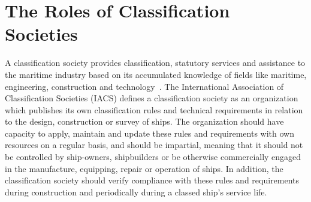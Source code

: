 % 

\section{The Roles of Classification Societies}
A classification society provides classification, statutory services and assistance to the maritime industry based on its accumulated knowledge of fields like
maritime, engineering, construction and technology~\citep{Hormann2006}.
The International Association of Classification Societies (IACS) defines a classification society as an organization which
publishes its own classification rules and technical requirements in relation to the design, construction or survey of ships. 
The organization should have capacity to apply, maintain and update these rules and requirements with own resources on a regular basis, and should 
be impartial, meaning that it should not be controlled by ship-owners, shipbuilders or be otherwise commercially engaged in the manufacture, 
equipping, repair or operation of ships.
In addition, the classification society should verify compliance with these rules and requirements during construction and periodically during a classed
ship's service life. 

